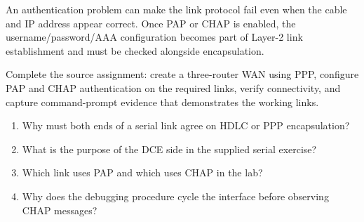 \begin{pitfall}
An authentication problem can make the link protocol fail even when the cable and IP address appear correct. Once PAP or CHAP is enabled, the username/password/AAA configuration becomes part of Layer-2 link establishment and must be checked alongside encapsulation.
\end{pitfall}

\begin{tryit}
Complete the source assignment: create a three-router WAN using PPP, configure PAP and CHAP authentication on the required links, verify connectivity, and capture command-prompt evidence that demonstrates the working links.
\end{tryit}

\begin{quickcheck}
\begin{enumerate}
\item Why must both ends of a serial link agree on HDLC or PPP encapsulation?
\item What is the purpose of the DCE side in the supplied serial exercise?
\item Which link uses PAP and which uses CHAP in the lab?
\item Why does the debugging procedure cycle the interface before observing CHAP messages?
\end{enumerate}
\end{quickcheck}
